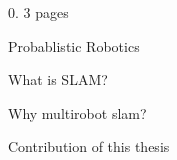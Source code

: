 0. 3 pages

Probablistic Robotics

What is SLAM?

Why multirobot slam?

Contribution of this thesis
